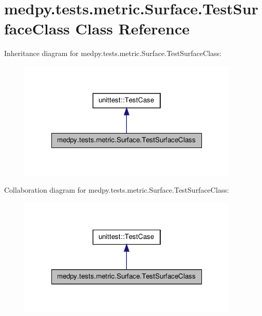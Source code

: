 \hypertarget{classmedpy_1_1tests_1_1metric_1_1Surface_1_1TestSurfaceClass}{
\section{medpy.tests.metric.Surface.TestSurfaceClass Class Reference}
\label{classmedpy_1_1tests_1_1metric_1_1Surface_1_1TestSurfaceClass}
}


Inheritance diagram for medpy.tests.metric.Surface.TestSurfaceClass:\nopagebreak
\begin{figure}[H]
\begin{center}
\leavevmode
\includegraphics[width=298pt]{classmedpy_1_1tests_1_1metric_1_1Surface_1_1TestSurfaceClass__inherit__graph}
\end{center}
\end{figure}


Collaboration diagram for medpy.tests.metric.Surface.TestSurfaceClass:\nopagebreak
\begin{figure}[H]
\begin{center}
\leavevmode
\includegraphics[width=298pt]{classmedpy_1_1tests_1_1metric_1_1Surface_1_1TestSurfaceClass__coll__graph}
\end{center}
\end{figure}
